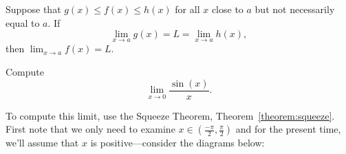 \begin{mainTheorem}\label{theorem:squeeze}
Suppose that $g(x) \le f(x) \le h(x)$ for all $x$
close to $a$ but not necessarily equal to $a$. If 
\[
\lim_{x\to a} g(x) = L = \lim_{x\to a} h(x),
\] 
then $\lim_{x\to a} f(x) = L$.
\end{mainTheorem}

\begin{example}
Compute
\[
\lim_{x\to 0} \frac{\sin(x)}{x}.
\]
\end{example}

\begin{solution}
To compute this limit, use the Squeeze Theorem,
Theorem~\ref{theorem:squeeze}. First note that we only need to examine
$x\in \left(\frac{-\pi}{2}, \frac{\pi}{2}\right)$ and for the present
time, we'll assume that $x$ is positive---consider the diagrams below:




\end{solution}
